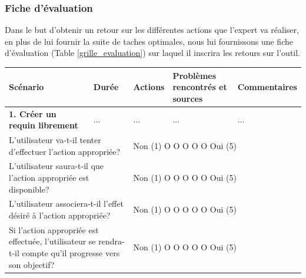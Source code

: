 \documentclass{article}
\begin{document}
\subsubsection{Fiche d'évaluation}
Dans le but d'obtenir un retour sur les différentes actions que l'expert va réaliser, en plus de lui fournir la suite de taches optimales, nous lui fournissons une fiche d'évaluation (Table \ref{grille_evaluation}) sur laquel il inscrira les retours sur l'outil.

\newpage
\begin{table}[h]
	\centering
	\begin{tabular}{|p{6cm}|p{1.5cm}|p{1.5cm}|p{2.5cm}|p{3.5cm}|}
		\hline
		\textbf{Scénario}                                                                                                                         & \textbf{Durée}                                        & \textbf{Actions} & \textbf{Problèmes rencontrés et sources} & \textbf{Commentaires} \\ \hline
		\textbf{1. Créer un requin librement}                                                                                                     & ...                                                   & ...              & ...                                      & ...                   \\ \hline
		\multicolumn{2}{|p{7.5cm}|}{L’utilisateur va-t-il tenter d’effectuer l’action appropriée?}                                                & \multicolumn{3}{p{7.5cm}|}{Non (1) O O O O O Oui (5)}                                                                                       \\ \hline
		\multicolumn{2}{|p{7.5cm}|}{L’utilisateur saura-t-il que l’action appropriée est disponible?}                                             & \multicolumn{3}{p{7.5cm}|}{Non (1) O O O O O Oui (5)}                                                                                       \\ \hline
		\multicolumn{2}{|p{7.5cm}|}{L’utilisateur associera-t-il l’effet désiré à l’action appropriée?}                                           & \multicolumn{3}{p{7.5cm}|}{Non (1) O O O O O Oui (5)}                                                                                       \\ \hline
		\multicolumn{2}{|p{7.5cm}|}{Si l’action appropriée est effectuée, l’utilisateur se rendra-t-il compte qu’il progresse vers son objectif?} & \multicolumn{3}{p{7.5cm}|}{Non (1) O O O O O Oui (5)}                                                                                       \\ \hline

\end{tabular}
\end{table}
\end{document}
